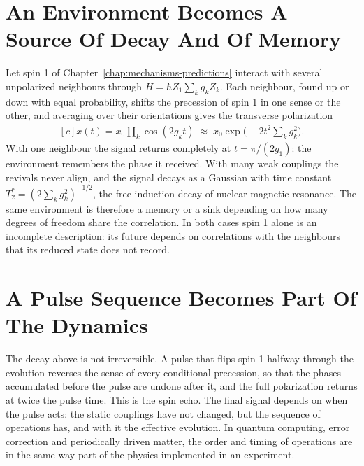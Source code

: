 \documentclass[11pt,oneside]{book}
\newenvironment{centeredalign}{\[\begin{gathered}[c]}{\end{gathered}\]}
\begin{document}
\section{An Environment Becomes A Source Of Decay And Of Memory}
Let spin 1 of Chapter~\ref{chap:mechanisms-predictions} interact with several unpolarized neighbours through
\(H=\hbar Z_1\sum_kg_kZ_k\). Each neighbour, found up or down with equal probability, shifts the precession of spin 1 in
one sense or the other, and averaging over their orientations gives the transverse polarization
\begin{centeredalign}
x(t)=x_0\prod_k\cos(2g_kt)\;\approx\;x_0\exp\!\Big(-2t^2\sum_kg_k^2\Big).
\end{centeredalign}
With one neighbour the signal returns completely at \(t=\pi/(2g_1)\): the environment remembers the phase it received.
With many weak couplings the revivals never align, and the signal decays as a Gaussian with time constant
\(T_2^*=(2\sum_kg_k^2)^{-1/2}\), the free-induction decay of nuclear magnetic resonance. The same environment is
therefore a memory or a sink depending on how many degrees of freedom share the correlation. In both cases spin 1
alone is an incomplete description: its future depends on correlations with the neighbours that its reduced state does
not record.

\section{A Pulse Sequence Becomes Part Of The Dynamics}
The decay above is not irreversible. A pulse that flips spin 1 halfway through the evolution reverses the sense of
every conditional precession, so that the phases accumulated before the pulse are undone after it, and the full
polarization returns at twice the pulse time. This is the spin echo. The final signal depends on when the pulse acts:
the static couplings have not changed, but the sequence of operations has, and with it the effective evolution. In
quantum computing, error correction and periodically driven matter, the order and timing of operations are in the
same way part of the physics implemented in an experiment.
\end{document}
